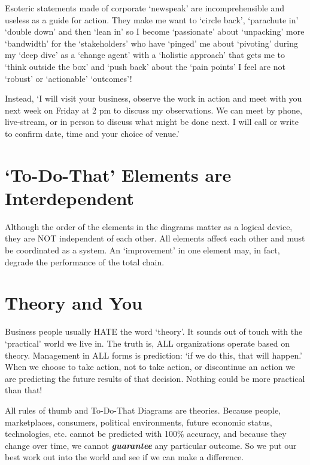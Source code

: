 \documentclass[
]{book}
\begin{document}
Esoteric statements made of corporate `newspeak' are incomprehensible and useless as a guide for action. They make me want to `circle back', `parachute in' `double down' and then `lean in' so I become `passionate' about `unpacking' more `bandwidth' for the `stakeholders' who have `pinged' me about `pivoting' during my `deep dive' as a `change agent' with a `holistic approach' that gets me to `think outside the box' and `push back' about the `pain points' I feel are not `robust' or `actionable' `outcomes'!

Instead, `I will visit your business, observe the work in action and meet with you next week on Friday at 2 pm to discuss my observations. We can meet by phone, live-stream, or in person to discuss what might be done next. I will call or write to confirm date, time and your choice of venue.'

\hypertarget{to-do-that-elements-are-interdependent}{%
\section{`To-Do-That' Elements are Interdependent}\label{to-do-that-elements-are-interdependent}}

Although the order of the elements in the diagrams matter as a logical device, they are NOT independent of each other. All elements affect each other and must be coordinated as a system. An `improvement' in one element may, in fact, degrade the performance of the total chain.

\hypertarget{theory-and-you}{%
\section{Theory and You}\label{theory-and-you}}

Business people usually HATE the word `theory'. It sounds out of touch with the `practical' world we live in. The truth is, ALL organizations operate based on theory. Management in ALL forms is prediction: `if we do this, that will happen.' When we choose to take action, not to take action, or discontinue an action we are predicting the future results of that decision. Nothing could be more practical than that!

All rules of thumb and To-Do-That Diagrams are theories. Because people, marketplaces, consumers, political environments, future economic status, technologies, etc. cannot be predicted with 100\% accuracy, and because they change over time, we cannot \textbf{\emph{guarantee}} any particular outcome. So we put our best work out into the world and see if we can make a difference.
\end{document}
